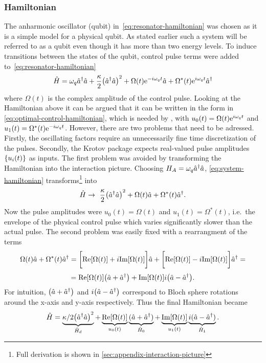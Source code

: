 \documentclass[main.tex]{subfiles}
\begin{document}
\subsubsection{Hamiltonian}
The anharmonic oscillator (qubit) in~\cref{eq:resonator-hamiltonian} was chosen as it is a simple model for a physical qubit.
As stated earlier such a system will be referred to as a qubit even though it has more than two energy levels.
To induce transitions between the states of the qubit, control pulse terms were added to~\cref{eq:resonator-hamiltonian}
\begin{equation}
    \hat{H} = \omega_{q} \hat{a}^\dagger\hat{a} + \frac{\kappa}{2} \qty(\hat{a}^\dagger\hat{a})^2 + \Omega(t)\mathrm{e}^{-i\omega_{q}t}\hat{a} + \Omega^*(t)\mathrm{e}^{i\omega_{q}t}\hat{a}^\dagger
    \label{eq:system-hamiltonian}
\end{equation}
where \( \Omega(t) \) is the complex amplitude of the control pulse.
Looking at the Hamiltonian above it can be argued that it can be written in the form in \cref{eq:optimal-control-hamiltonian}, which is needed by \krotov{}, with \( u_0(t) = \Omega(t)\mathrm{e}^{i\omega_{q}t} \) and \( u_1(t) = \Omega^*(t)\mathrm{e}^{-i\omega_{q}t} \).
However, there are two problems that need to be adressed.
Firstly, the oscillating factors require an unnecessarily fine time discretization of the pulses.
Secondly, the Krotov package expects real-valued pulse amplitudes \( \qty{u_i(t)} \) as inputs.
The first problem was avoided by transforming the Hamiltonian into the interaction picture.
Choosing \( H_A = \omega_{q} \hat{a}^\dagger\hat{a} \), \cref{eq:system-hamiltonian} transforms\footnote{Full derivation is shown in \cref{sec:appendix-interaction-picture}} into
\begin{equation}
    \hat{H} \rightarrow~ \frac{\kappa}{2}\qty(\hat{a}^\dagger\hat{a})^2 + \Omega(t)\hat{a} + \Omega^*(t)\hat{a}^\dagger.
    \label{eq:krotov-hamiltonian-rotating}
\end{equation}
Now the pulse amplitudes were \( u_0(t) = \Omega(t) \) and \( u_1(t) = \Omega^*(t) \), i.e.\ the envelope of the physical control pulse which varies significantly slower than the actual pulse.
The second problem was easily fixed with a rearrangment of the terms
\[ \Omega(t)\hat{a} + \Omega^*(t)\hat{a}^\dagger = \bigg[\text{Re}\qty[\Omega(t)]+i\text{Im}\qty[\Omega(t)]\bigg]\hat{a} + \bigg[\text{Re}\qty[\Omega(t)]-i\text{Im}\qty[\Omega(t)]\bigg]\hat{a}^\dagger = \]
\[ = \text{Re}\qty[\Omega(t)]\qty(\hat{a} + \hat{a}^\dagger) + \text{Im}\qty[\Omega(t)]i\qty(\hat{a} - \hat{a}^\dagger). \]
For intuition, \( \qty(\hat{a} + \hat{a}^\dagger) \) and \( i\qty(\hat{a} - \hat{a}^\dagger) \) correspond to Bloch sphere rotations around the x-axis and y-axis respectively. 
Thus the final Hamiltonian became
\begin{equation}
    \hat{H} = \underbrace{\kappa/2\qty(\hat{a}^\dagger\hat{a})^2}_{\hat{H}_d} + \underbrace{\text{Re}\qty[\Omega(t)]}_{u_0(t)}\underbrace{(\hat{a} + \hat{a}^\dagger)}_{\hat{H}_0} + \underbrace{\text{Im}\qty[\Omega(t)]}_{u_1(t)}\underbrace{i(\hat{a} - \hat{a}^\dagger)}_{\hat{H}_1} .
    \label{eq:system-hamiltonian-rotating}
\end{equation}
\end{document}

